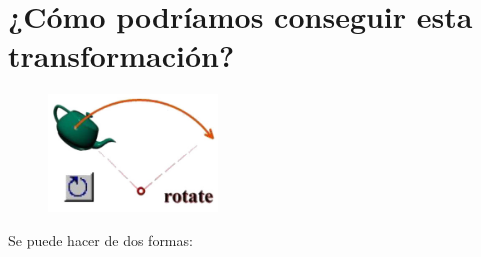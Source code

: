 \documentclass{article}
\begin{document}
 \newpage

\section{¿Cómo podríamos conseguir esta transformación?}

\begin{figure}[H]
   \centering
   \includegraphics[width=0.4\textwidth]{imagenes/tetera.jpg}
\end{figure}

Se puede hacer de dos formas:
\end{document}

